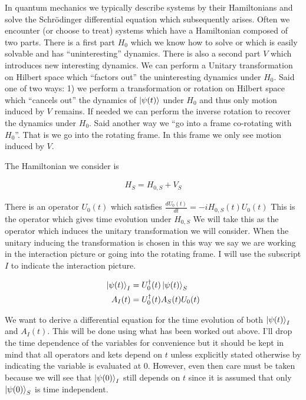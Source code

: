 \documentclass[12pt]{article}
\begin{document}
In quantum mechanics we typically describe systems by their Hamiltonians and solve the Schr{\"o}dinger differential equation which subsequently arises.
Often we encounter (or choose to treat) systems which have a Hamiltonian composed of two parts. There is a first part $H_0$ which we know how to solve or which is easily solvable and has ``uninteresting'' dynamics. There is also a second part $V$ which introduces new interesting dynamics. We can perform a Unitary transformation on Hilbert space which ``factors out'' the uninteresting dynamics under $H_0$. Said one of two ways: 1) we perform a transformation or rotation on Hilbert space which ``cancels out'' the dynamics of $\ket{\psi(t)}$ under $H_0$ and thus only motion induced by $V$ remains. If needed we can perform the inverse rotation to recover the dynamics under $H_0$. Said another way we ``go into a frame co-rotating with $H_0$''. That is we go into the rotating frame. In this frame we only see motion induced by $V$.

The Hamiltonian we consider is

\begin{align}
H_S = H_{0,S} + V_S
\end{align}

There is an operator $U_0(t)$ which satisfies $\frac{d U_0(t)}{d t} = -i H_{0,S}(t) U_0(t)$ This is the operator which gives time evolution under $H_{0,S}$ We will take this as the operator which induces the unitary transformation we will consider. When the unitary inducing the transformation is chosen in this way we say we are working in the interaction picture or going into the rotating frame. I will use the subscript $I$ to indicate the interaction picture.

\begin{align}
\ket{\psi(t)}_I &= U_0^{\dag}(t) \ket{\psi(t)}_S\\
A_I(t) &= U_0^{\dag}(t) A_S(t) U_0(t)
\end{align}

We want to derive a differential equation for the time evolution of both $\ket{\psi(t)}_I$ and $A_I(t)$. This will be done using what has been worked out above. I'll drop the time dependence of the variables for convenience but it should be kept in mind that all operators and kets depend on $t$ unless explicitly stated otherwise by indicating the variable is evaluated at $0$. However, even then care must be taken because we will see that $\ket{\psi(0)}_I$ still depends on $t$ since it is assumed that only $\ket{\psi(0)}_S$ is time independent.
\end{document}
